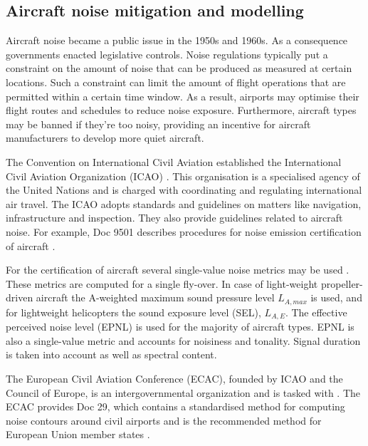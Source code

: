 \subsection{Aircraft noise mitigation and modelling}
Aircraft noise became a public issue in the 1950s and 1960s. As a consequence
governments enacted legislative controls. Noise regulations typically put a
constraint on the amount of noise that can be produced as measured at certain
locations. Such a constraint can limit the amount of flight operations that are
permitted within a certain time window. As a result, airports may optimise their
flight routes and schedules to reduce noise exposure. Furthermore, aircraft
types may be banned if they're too noisy, providing an incentive for
aircraft manufacturers to develop more quiet aircraft.


The Convention on International Civil Aviation established the International
Civil Aviation Organization (ICAO) \cite{ICAO2017}. This organisation is a
specialised agency of the United Nations and is charged with coordinating and
regulating international air travel. The ICAO adopts standards and guidelines on
matters like navigation, infrastructure and inspection. They also provide
guidelines related to aircraft noise. For example, Doc 9501 describes procedures
for noise emission certification of aircraft \cite{ICAO_9501}.

For the certification of aircraft several single-value noise metrics may be
used \cite{}. These metrics are computed for a single fly-over. In case of light-weight
propeller-driven aircraft the A-weighted maximum sound pressure level
$L_{A,max}$ is used, and for lightweight helicopters the sound exposure level
(SEL), $L_{A,E}$. The effective perceived noise level (EPNL) is used for the
majority of aircraft types. EPNL is also a single-value metric and accounts for
noisiness and tonality. Signal duration is taken into account as well as
spectral content.



The European Civil Aviation Conference (ECAC), founded by ICAO and the Council
of Europe, is an intergovernmental organization and is tasked with  \cite{ECAC2017}. The ECAC provides Doc 29, which
contains a standardised method for computing noise contours around civil
airports \cite{Doc29_fourth_2016} and is the recommended method for European
Union member states \cite{directive_2002_49_ec}.

